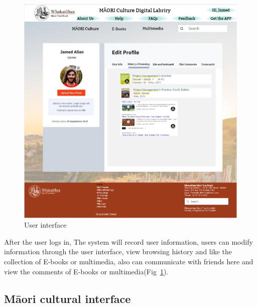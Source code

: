 \begin{figure}[htbp]
  \centerline{\includegraphics[width=400pt]{images/3-1-2.png}}
  \caption{User interface}
  \label{fig31}
\end{figure}

After the user logs in, The system will record user information, users can modify information through the user interface, view browsing history and like the collection of E-books or multimedia, also can communicate with friends here and view the comments of E-books or multimedia(Fig~\ref{fig31}).

\subsection{Māori cultural interface}


